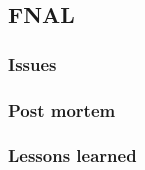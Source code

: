 
\subsection{FNAL}
\label{sec:site:fnal}

\subsubsection{Issues}
\label{sec:site:fnal:Issues}

\subsubsection{Post mortem}
\label{sec:site:fnal:postmortem}

\subsubsection{Lessons learned}
\label{sec:site:fnal:lessons}
